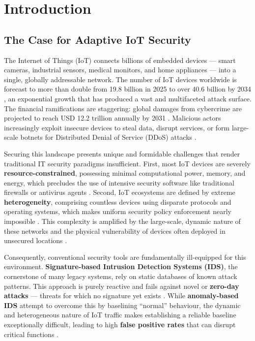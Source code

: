 \chapter{Introduction}\label{cap:intro}

\section{The Case for Adaptive IoT Security}\label{sec:case_for_adaptive_security}
The Internet of Things (IoT) connects billions of embedded devices --- smart cameras, industrial sensors, medical monitors, and home appliances --- into a single, globally addressable network. The number of IoT devices worldwide is forecast to more than double from 19.8 billion in 2025 to over 40.6 billion by 2034 \cite{Statista2025}, an exponential growth that has produced a vast and multifaceted attack surface. The financial ramifications are staggering: global damages from cybercrime are projected to reach USD 12.2 trillion annually by 2031 \cite{Morgan2025}. Malicious actors increasingly exploit insecure devices to steal data, disrupt services, or form large-scale botnets for Distributed Denial of Service (DDoS) attacks \cite{Neto2023,Tawalbeh2020}.

Securing this landscape presents unique and formidable challenges that render traditional IT security paradigms insufficient. First, most IoT devices are severely \textbf{resource-constrained}, possessing minimal computational power, memory, and energy, which precludes the use of intensive security software like traditional firewalls or antivirus agents \cite{Chen2021}. Second, IoT ecosystems are defined by extreme \textbf{heterogeneity}, comprising countless devices using disparate protocols and operating systems, which makes uniform security policy enforcement nearly impossible \cite{Mavroeidis2023}. This complexity is amplified by the large-scale, dynamic nature of these networks and the physical vulnerability of devices often deployed in unsecured locations \cite{AlGaradi2020}.

Consequently, conventional security tools are fundamentally ill-equipped for this environment. \textbf{Signature-based Intrusion Detection Systems (IDS)}, the cornerstone of many legacy systems, rely on static databases of known attack patterns. This approach is purely reactive and fails against novel or \textbf{zero-day attacks} --- threats for which no signature yet exists \cite{Khraisat2019,Yang2024}. While \textbf{anomaly-based IDS} attempt to overcome this by baselining ``normal'' behaviour, the dynamic and heterogeneous nature of IoT traffic makes establishing a reliable baseline exceptionally difficult, leading to high \textbf{false positive rates} that can disrupt critical functions \cite{Ibitoye2021,Tharewal2022}.

